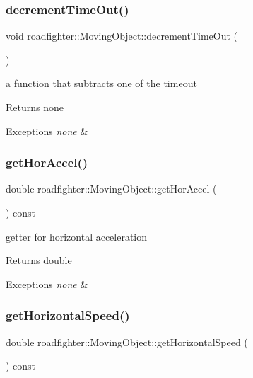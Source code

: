 \subsubsection{\texorpdfstring{decrement\+Time\+Out()}{decrementTimeOut()}}
{\footnotesize\ttfamily void roadfighter\+::\+Moving\+Object\+::decrement\+Time\+Out (\begin{DoxyParamCaption}{ }\end{DoxyParamCaption})}

a function that subtracts one of the timeout \begin{DoxyReturn}{Returns}
none 
\end{DoxyReturn}

\begin{DoxyExceptions}{Exceptions}
{\em none} & \\
\hline
\end{DoxyExceptions}
\mbox{\label{classroadfighter_1_1MovingObject_a00ed8d1d735142a802792954089e2081}} 
\subsubsection{\texorpdfstring{get\+Hor\+Accel()}{getHorAccel()}}
{\footnotesize\ttfamily double roadfighter\+::\+Moving\+Object\+::get\+Hor\+Accel (\begin{DoxyParamCaption}{ }\end{DoxyParamCaption}) const}

getter for horizontal acceleration \begin{DoxyReturn}{Returns}
double 
\end{DoxyReturn}

\begin{DoxyExceptions}{Exceptions}
{\em none} & \\
\hline
\end{DoxyExceptions}
\mbox{\label{classroadfighter_1_1MovingObject_a26e23531dea4a66777f7a3fd61fa4a21}} 
\subsubsection{\texorpdfstring{get\+Horizontal\+Speed()}{getHorizontalSpeed()}}
{\footnotesize\ttfamily double roadfighter\+::\+Moving\+Object\+::get\+Horizontal\+Speed (\begin{DoxyParamCaption}{ }\end{DoxyParamCaption}) const}

